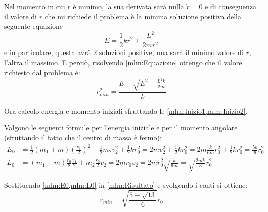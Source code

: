 \documentclass[../main.tex]{subfiles}
\begin{document}
Nel momento in cui $r$ è minimo, la sua derivata sarà nulla $\dot r=0$ e di conseguenza il valore di $r$ che mi richiede il problema è la minima soluzione positiva della seguente equazione
\begin{equation}\label{mlm:Equazione}
	E=\frac12kr^2+\frac{L^2}{2mr^2}
\end{equation}
e in particolare, questa avrà 2 soluzioni positive, una sarà il minimo valore di $r$, l'altra il massimo. E perciò, risolvendo \cref{mlm:Equazione} ottengo che il valore richiesto dal problema è:
\begin{equation}\label{mlm:Risultato}
	r^2_{min}=\frac{E-\sqrt{E^2-\frac{L^2k}{2m}}}{k}
\end{equation}

Ora calcolo energia e momento iniziali sfruttando le \cref{mlm:Inizio1,mlm:Inizio2}.

Valgono le seguenti formule per l'energia iniziale e per il momento angolare (sfruttando il fatto che il centro di massa è fermo):
\begin{align}
	E_0 &=\frac12(m_1+m)\left(\frac{v_1}2\right)^2+\frac12m_2v_2^2+\frac12kr_0^2=
	2mv_2^2+\frac12kr_0^2=2m\frac{k}{6m}r_0^2+\frac12kr_0^2=\frac{5k}{6}r_0^2 \label{mlm:E0}\\
	L_0 &=(m_1+m)\frac{r_0}2\frac{v_1}2+m_2\frac{r_0}2v_2=2mr_0v_2=
	2mr_0^2\sqrt{\frac{k}{6m}}=\sqrt{\frac{2mk}3}r_0^2 \label{mlm:L0}
\end{align}

Sostituendo \cref{mlm:E0,mlm:L0} in \cref{mlm:Risultato} e svolgendo i conti si ottiene:
\begin{equation*}
	r_{min}=\sqrt{\frac{5-\sqrt{13}}6}r_0
\end{equation*}
\end{document}
